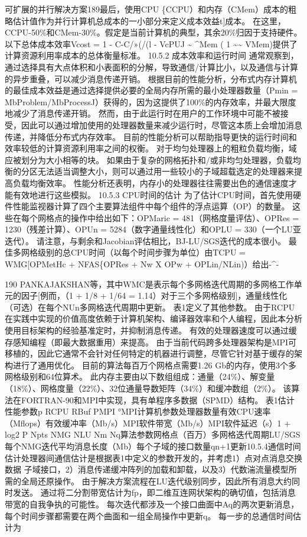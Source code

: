 \documentclass[UTF8,11pt,a4paper,openany,fontset=fandol]{ctexbook}
\begin{document}
可扩展的并行解决方案189最后，使用CPU \{CCPU）和内存（CMem）成本的粗略估计值作为并行计算机总成本的一小部分来定义成本效益t]成本。 在这里，CCPU-50\%和CMem-30\%。假定是当前计算机的典型，其余20\%归因于支持硬件。 以下总体成本效率Vcost = 1 - C-C/»(/(l - VcPUJ \textasciitilde{} \textasciicircum{}Mem ( 1 \textasciitilde{}\textasciitilde{} VMem)提供了计算资源利用率成本的总体衡量标准。 10.5.2 成本效率和运行时间 通常观察到，通过选择具有大点体积和小表面积的分解，导致通信/计算比小，以及通信与计算的异步重叠，可以减少消息传递开销。 根据目前的性能分析，分布式内存计算机的最佳成本效益是通过选择提供必要的全局内存所需的最小处理器数量（Pmin = MbProblem/MbProcessJ）获得的，因为这提供了100\%的内存效率，并最大限度地减少了消息传递开销。 然而，由于此运行时在用户的工作环境中可能不被接受，因此可以通过增加使用的处理器数量来减少运行时，尽管这本质上会增加消息传递，并降低分布式内存效率。 目前的性能分析可以帮助指导更快的运行时间和效率较低的计算资源利用率之间的权衡。 对于均匀处理器上的粗粒负载均衡，域应被划分为大小相等的块。 如果由于复杂的网格拓扑和/或非均匀处理器，负载均衡的分区无法适当调整大小，则可以通过用一些较小的子域超载选定的处理器来提高负载均衡效率。 性能分析还表明，内存小的处理器往往需要出色的通信速度才能有效地进行这些模拟。 10.5.3 CPU时间的估计 为了估计CPU时间，首先使用硬件性能监视器计算了四个主要算法组件中每个组件的浮点运算（OP）的数量。 这些在每个网格点的操作中给出如下：OPMaric = 481（网格度量评估）、OPRes = 1230（残差计算）、OPUn = 5284（数字通量线性化）和OPLU = 330（一个LU亚迭代）。 请注意，与剩余和Jacobian评估相比，BJ-LU/SGS迭代的成本很小。 最佳多网格级别的总CPU时间（以每个时间步骤为单位）由TCPU = WMG[OPMetHc + NFAS\{OPRes + Nw X OPw + OPLin/NLin)）给出-\textasciicircum{}-

190 PANKAJAKSHAN等，其中WMC是表示每个多网格迭代周期的多网格工作单元的因子[例而，（1 + 1/8 + 1/64 = 1.14）对于三个多网格级别]，通量线性化（可选）在每个NUn多网格迭代周期中更新。 表1定义了其他参数。 由于RCPU在实践中实现的价值高度依赖于计算机架构、编译器效率和个人编程，因此本分析使用目标架构的经验基准定时，并抑制消息传递。 有效的处理器速度可以通过缓存感知编程（即最大数据重用）来提高。 由于当前代码跨多处理器架构是MPI可移植的，因此它通常不会针对任何特定的机器进行调整，尽管它针对基于缓存的架构进行了通用优化。 目前的算法每百万个网格点需要1.26 Gb的内存，使用3个多网格级别和64位算术。 此内存主要由以下数组组成：通量（24\%）、解变量（18\%）、网格度量（22\%）、32位通量导数矩阵（34\%）和缓冲数组（2\%）。 该算法在FORTRAN-90和MPI中实现，具有单程序多数据（SPMD）结构。 表1估计性能参数p RCPU RBuf PMPI °MPI计算机参数处理器数量有效CPU速率（Mflops）有效缓冲率（Mb/s）MPI软件带宽（Mb/s）MPI软件延迟（s）1 + log2 P Npts NMG NLU Nm Nq算法参数网格点（百万）多网格迭代周期LU/SGS每个NMG迭代平均消息长度（Mb）每个子域的接口数量qn+1更新10.5.4通信时间估计处理器间通信估计是根据表1中定义的参数开发的，并考虑1）点对点消息交换数据 子域接口，2）消息传递缓冲阵列的加载和卸载，以及3）代数湍流量模型所需的全局还原操作。 由于解决方案流程在LU迭代级别同步，因此所有消息大约同时发送。 通过将二分割带宽估计为fp，即二维互连网状架构的确切值，包括消息带宽的自我争执的可能性。 每次迭代都涉及一个接口曲面中Aq的两次更新消息，每个时间步骤都需要在两个曲面和一组全局操作中更新q。 每一步的总通信时间估计为
\end{document}
